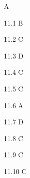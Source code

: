 \begin{Solution}{11}
A
\end{Solution}
\begin{Solution}{11.{1}}
B
\end{Solution}
\begin{Solution}{11.{2}}
C
\end{Solution}
\begin{Solution}{11.{3}}
D
\end{Solution}
\begin{Solution}{11.{4}}
C
\end{Solution}
\begin{Solution}{11.{5}}
C
\end{Solution}
\begin{Solution}{11.{6}}
A
\end{Solution}
\begin{Solution}{11.{7}}
D
\end{Solution}
\begin{Solution}{11.{8}}
C
\end{Solution}
\begin{Solution}{11.{9}}
C
\end{Solution}
\begin{Solution}{11.{10}}
C
\end{Solution}
